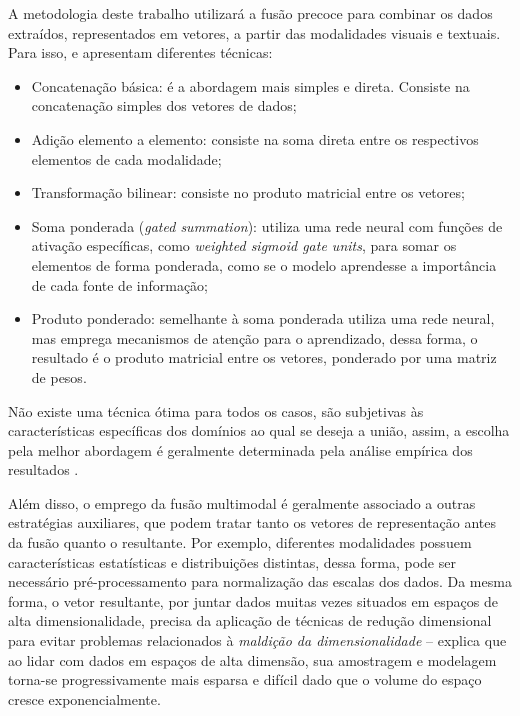 A metodologia deste trabalho utilizará a fusão precoce para combinar os dados extraídos, representados em vetores, a partir das modalidades visuais e textuais. Para isso, \citeauthor*{multimodalmeta} \cite*{multimodalmeta} e \citeauthor*{multimodalforgery} \cite*{multimodalforgery} apresentam diferentes técnicas:

\begin{itemize}
	\item Concatenação básica: é a abordagem mais simples e direta. Consiste na concatenação simples dos vetores de dados;
	\item Adição elemento a elemento: consiste na soma direta entre os respectivos elementos de cada modalidade;
	\item Transformação bilinear: consiste no produto matricial entre os vetores;
	\item Soma ponderada (\textit{gated summation}): utiliza uma rede neural com funções de ativação específicas, como \textit{weighted sigmoid gate units}, para somar os elementos de forma ponderada, como se o modelo aprendesse a importância de cada fonte de informação;
	\item Produto ponderado: semelhante à soma ponderada utiliza uma rede neural, mas emprega mecanismos de atenção para o aprendizado, dessa forma, o resultado é o produto matricial entre os vetores, ponderado por uma matriz de pesos.
\end{itemize}

Não existe uma técnica ótima para todos os casos, são subjetivas às características específicas dos domínios ao qual se deseja a união, assim, a escolha pela melhor abordagem é geralmente determinada pela análise empírica dos resultados \cite{multimodalmeta}.

Além disso, o emprego da fusão multimodal é geralmente associado a outras estratégias auxiliares, que podem tratar tanto os vetores de representação antes da fusão quanto o resultante. Por exemplo, diferentes modalidades possuem características estatísticas e distribuições distintas, dessa forma, pode ser necessário pré-processamento para normalização das escalas dos dados. Da mesma forma, o vetor resultante, por juntar dados muitas vezes situados em espaços de alta dimensionalidade, precisa da aplicação de técnicas de redução dimensional para evitar problemas relacionados à \textit{maldição da dimensionalidade} -- \citeauthor*{bellmancurse} \cite*{bellmancurse} explica que ao lidar com dados em espaços de alta dimensão, sua amostragem e modelagem torna-se progressivamente mais esparsa e difícil dado que o volume do espaço cresce exponencialmente.

